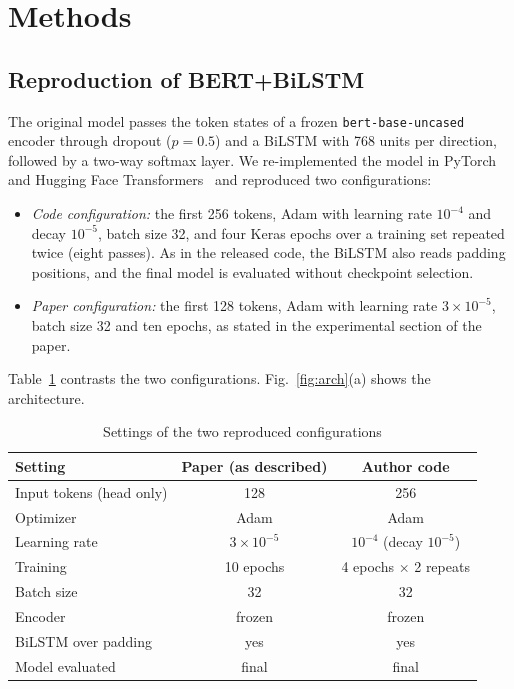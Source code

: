 \documentclass[conference]{IEEEtran}
\begin{document}
\section{Methods}

\subsection{Reproduction of BERT+BiLSTM}
The original model passes the token states of a frozen \texttt{bert-base-uncased} encoder through dropout ($p=0.5$) and a BiLSTM with 768 units per direction, followed by a two-way softmax layer. We re-implemented the model in PyTorch~\cite{paszke2019} and Hugging Face Transformers~\cite{wolf2020} and reproduced two configurations:
\begin{itemize}
\item \textit{Code configuration:} the first 256 tokens, Adam with learning rate $10^{-4}$ and decay $10^{-5}$, batch size 32, and four Keras epochs over a training set repeated twice (eight passes). As in the released code, the BiLSTM also reads padding positions, and the final model is evaluated without checkpoint selection.
\item \textit{Paper configuration:} the first 128 tokens, Adam with learning rate $3\times10^{-5}$, batch size 32 and ten epochs, as stated in the experimental section of the paper.
\end{itemize}
Table~\ref{tab:repro} contrasts the two configurations. Fig.~\ref{fig:arch}(a) shows the architecture.

\begin{table}[t]
\caption{Settings of the two reproduced configurations}
\label{tab:repro}
\centering
\footnotesize
\setlength{\tabcolsep}{4pt}
\begin{tabular}{lcc}
\toprule
Setting & Paper (as described) & Author code \\
\midrule
Input tokens (head only) & 128 & 256 \\
Optimizer & Adam & Adam \\
Learning rate & $3\times10^{-5}$ & $10^{-4}$ (decay $10^{-5}$) \\
Training & 10 epochs & 4 epochs $\times$ 2 repeats \\
Batch size & 32 & 32 \\
Encoder & frozen & frozen \\
BiLSTM over padding & yes & yes \\
Model evaluated & final & final \\
\bottomrule
\end{tabular}
\end{table}
\end{document}
